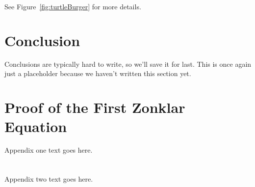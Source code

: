 \documentclass[a4paper, 10pt, american, titlepage]{article}
\begin{document}
See Figure~\ref{fig:turtleBurger} for more details.

\section{Conclusion}
\label{sec:conclusion}

Conclusions are typically hard to write, so we'll save it for last. This is
once again just a placeholder because we haven't written this section yet.

\lipsum[1]

\clearpage %

\printbibliography

\appendices
\section{Proof of the First Zonklar Equation}
Appendix one text goes here.

\section{}
Appendix two text goes here.
\end{document}
